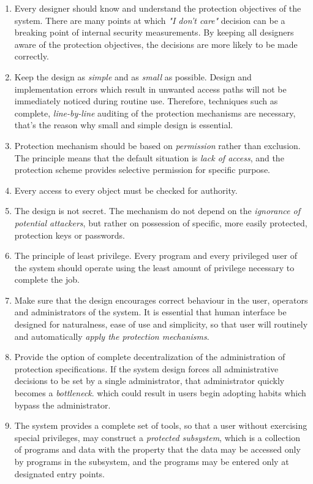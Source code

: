 \begin{enumerate}
    \item Every designer should know and understand the protection objectives of the system.
     There are many points at which \textit{"I don't care"} decision can be a breaking point 
     of internal security measurements. By keeping all designers aware of the protection objectives, 
     the decisions are more likely to be made correctly.
     
     \item Keep the design as \textit{simple} and as \textit{small} as possible. Design and 
     implementation errors which result in unwanted access paths will not be immediately noticed during 
     routine use. Therefore, techniques such as complete, \textit{line-by-line} auditing of the 
     protection mechanisms are necessary, that's the reason why small and simple design is 
     essential.

     \item Protection mechanism should be based on \textit{permission} rather than exclusion. 
     The principle means that the default situation is \textit{lack of access}, and the protection 
     scheme provides selective permission for specific purpose.

     \item Every access to every object must be checked for authority.
     
     \item The design is not secret. The mechanism do not depend on the \textit{ignorance of potential 
     attackers}, but rather on possession of specific, more easily protected, protection keys or 
     passwords. 

     \item The principle of least privilege. Every program and every privileged user of the system 
     should operate using the least amount of privilege necessary to complete the job.

     \item Make sure that the design encourages correct behaviour in the user, operators and 
     administrators of the system. It is essential that human interface be designed for naturalness, 
     ease of use and simplicity, so that user will routinely and automatically \textit{apply the 
     protection mechanisms}.

     \item Provide the option of complete decentralization of the administration of protection 
     specifications. If the system design forces all administrative decisions to be set by a single 
     administrator, that administrator quickly becomes a \textit{bottleneck}. which could result in users 
     begin adopting habits which bypass the administrator.

     \item The system provides a complete set of tools, so that a user without exercising special 
     privileges, may construct a \textit{protected subsystem}, which is a collection of programs 
     and data with the property that the data may be accessed only by programs in the subsystem, and 
     the programs may be entered only at designated entry points.
\end{enumerate}


